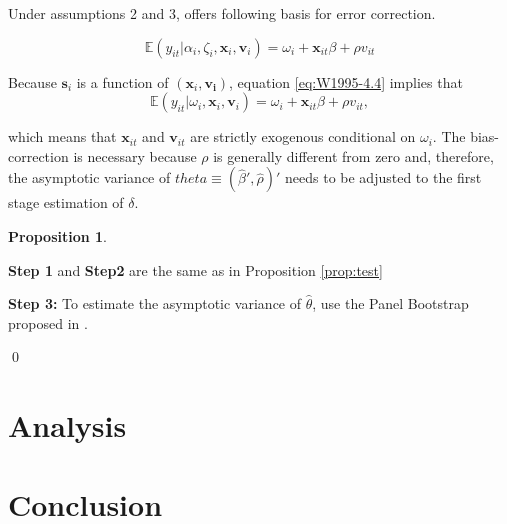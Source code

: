 \documentclass[a4paper,12pt]{article}
\theoremstyle{plain}
\theoremstyle{definition}
\theoremstyle{definition}
\theoremstyle{definition}
\newtheorem{proposition}[theorem]{Proposition}
\theoremstyle{definition}
\begin{document}
Under assumptions 2 and 3, \citet{wooldridge2010} offers following basis for error correction. 

\begin{equation}
    \label{eq:W1995-4.4}
    \mathbb{E}(y_{it}|\alpha_i, \zeta_i, \mathbf{x}_i, \mathbf{v}_i)= \omega_i+\mathbf{x}_{it}\beta+\rho v_{it}
\end{equation}

Because $\mathbf{s}_i$ is a function of $(\mathbf{x}_i, \mathbf{v_i})$, equation \ref{eq:W1995-4.4} implies that
\begin{equation}
    \mathbb{E}(y_{it}|\omega_i, \mathbf{x}_i, \mathbf{v}_i)= \omega_i+\mathbf{x}_{it}\beta+\rho v_{it},
\end{equation}

which means that $\mathbf{x}_{it}$ and $\mathbf{v}_{it}$ are strictly exogenous conditional on $\omega_i$. The bias-correction is necessary because $\rho$ is generally different from zero and, therefore, the asymptotic variance of $\hat{theta}\equiv(\hat{\beta}',\hat{\rho})'$ needs to be adjusted to the first stage estimation of $\delta$.

\begin{proposition}\citep[][Procedure 4.1.1]{wooldridge1995}
\label{prop:correct}

\textbf{Step 1} and \textbf{Step2} are the same as in Proposition \ref{prop:test}

\textbf{Step 3:} To estimate the asymptotic variance of $\hat{\theta}$, use the Panel Bootstrap proposed in \citep{semykina2010}.

\qed
\end{proposition}

\section{Analysis}
\label{sec:findings}

\section{Conclusion}
\label{sec:conclusion}



\newpage
\small



\newpage
\appendix
\end{document}
